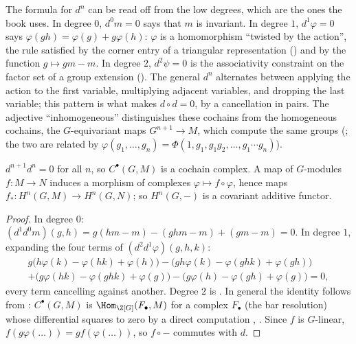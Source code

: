 The formula for $d^n$ can be read off from the low degrees, which are the ones the book uses. In degree $0$, $d^0m=0$ says that $m$ is invariant. In degree $1$,
$d^1\varphi=0$ says $\varphi(gh)=\varphi(g)+g\varphi(h)$: $\varphi$ is a homomorphism ``twisted by the action'', the rule satisfied by the corner entry of a triangular
representation () and by the function $g\mapsto gm-m$. In degree $2$, $d^2\psi=0$ is the associativity constraint on the factor set of a
group extension (). The general $d^n$ alternates between applying the action to the first variable, multiplying adjacent variables,
and dropping the last variable; this pattern is what makes $d\circ d=0$, by a cancellation in pairs. The adjective ``inhomogeneous'' distinguishes these cochains
from the homogeneous cochains, the $G$-equivariant maps $G^{n+1}\to M$, which compute the same groups (; the two are related by
$\varphi(g_1,\dots,g_n)=\Phi(1,g_1,g_1g_2,\dots,g_1\cdots g_n)$).

\begin{lemma}\label{lem:cohomology:dd}
$d^{n+1}d^n=0$ for all $n$, so $C^\bullet(G,M)$ is a cochain complex. A map of $G$-modules $f\colon M\to N$ induces a morphism of complexes
$\varphi\mapsto f\circ\varphi$, hence maps $f_*\colon H^n(G,M)\to H^n(G,N)$; so $H^n(G,-)$ is a covariant additive functor.
\end{lemma}

\begin{proof}
In degree $0$: $(d^1d^0m)(g,h)=g(hm-m)-(ghm-m)+(gm-m)=0$. In degree $1$, expanding the four terms of $(d^2d^1\varphi)(g,h,k)$:
\begin{multline*}
g\bigl(h\varphi(k)-\varphi(hk)+\varphi(h)\bigr)-\bigl(gh\varphi(k)-\varphi(ghk)+\varphi(gh)\bigr)\\
+\bigl(g\varphi(hk)-\varphi(ghk)+\varphi(g)\bigr)-\bigl(g\varphi(h)-\varphi(gh)+\varphi(g)\bigr)=0,
\end{multline*}
every term cancelling against another. Degree $2$ is . In general the identity follows from : $C^\bullet(G,M)$
is $\Hom_{\Z[G]}(F_\bullet,M)$ for a complex $F_\bullet$ (the bar resolution) whose differential squares to zero by a direct computation
\cite[Chapter III, Section 1]{Brown}, \cite[Chapter I, Section 2]{NSW}. Since $f$ is $G$-linear, $f(g\varphi(\dots))=gf(\varphi(\dots))$, so $f\circ-$ commutes
with $d$.
\end{proof}

